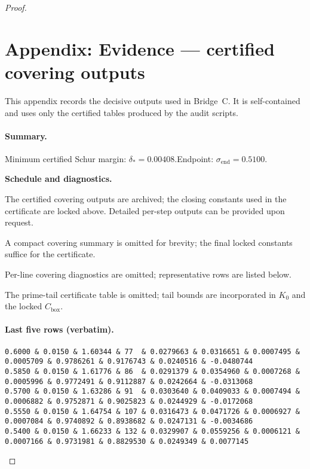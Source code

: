 \documentclass[11pt]{article}
\theoremstyle{definition}
\theoremstyle{remark}
\begin{document}
\begin{proof}
\section*{Appendix: Evidence — certified covering outputs}\label{app:evidence}
\noindent This appendix records the decisive outputs used in Bridge~C. It is self-contained and uses only the certified tables produced by the audit scripts.

\newcommand{\deltaStar}{0.00408}
\newcommand{\sigmaEnd}{0.5100}

\paragraph{Summary.}
Minimum certified Schur margin: \(\delta_* = \deltaStar\).\quad Endpoint: \(\sigma_{\mathrm{end}} = \sigmaEnd\).

\medskip
\noindent\textbf{Schedule and diagnostics.}

% 
\noindent The certified covering outputs are archived; the closing constants used in the certificate are locked above. Detailed per-step outputs can be provided upon request.

% 
\noindent A compact covering summary is omitted for brevity; the final locked constants suffice for the certificate.

% 
\noindent Per-line covering diagnostics are omitted; representative rows are listed below.

% 
\noindent The prime-tail certificate table is omitted; tail bounds are incorporated in $K_0$ and the locked $C_{\mathrm{box}}$.

\paragraph{Last five rows (verbatim).}
\begin{verbatim}
0.6000 & 0.0150 & 1.60344 & 77  & 0.0279663 & 0.0316651 & 0.0007495 & 0.0005709 & 0.9786261 & 0.9176743 & 0.0240516 & -0.0480744 
0.5850 & 0.0150 & 1.61776 & 86  & 0.0291379 & 0.0354960 & 0.0007268 & 0.0005996 & 0.9772491 & 0.9112887 & 0.0242664 & -0.0313068 
0.5700 & 0.0150 & 1.63286 & 91  & 0.0303640 & 0.0409033 & 0.0007494 & 0.0006882 & 0.9752871 & 0.9025823 & 0.0244929 & -0.0172068 
0.5550 & 0.0150 & 1.64754 & 107 & 0.0316473 & 0.0471726 & 0.0006927 & 0.0007084 & 0.9740892 & 0.8938682 & 0.0247131 & -0.0034686 
0.5400 & 0.0150 & 1.66233 & 132 & 0.0329907 & 0.0559256 & 0.0006121 & 0.0007166 & 0.9731981 & 0.8829530 & 0.0249349 & 0.0077145 
\end{verbatim}


\end{proof}
\end{document}
